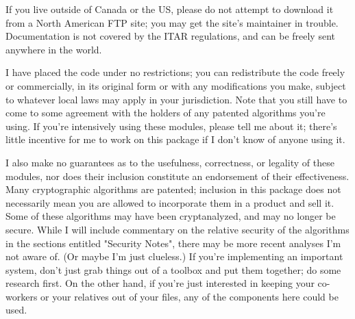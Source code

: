 \documentclass{howto}
\begin{document}


If you live outside of Canada or the US, please do not attempt to
download it from a North American FTP site; you may get the site's
maintainer in trouble.  Documentation is not covered by the ITAR
regulations, and can be freely sent anywhere in the world.

I have placed the code under no restrictions; you can redistribute the
code freely or commercially, in its original form or with any
modifications you make, subject to whatever local laws may apply in your
jurisdiction.  Note that you still have to come to some agreement with
the holders of any patented algorithms you're using.  If you're
intensively using these modules, please tell me about it; there's little
incentive for me to work on this package if I don't know of anyone using
it.

I also make no guarantees as to the usefulness, correctness, or legality
of these modules, nor does their inclusion constitute an endorsement of
their effectiveness.  Many cryptographic algorithms are patented;
inclusion in this package does not necessarily mean you are allowed to
incorporate them in a product and sell it.  Some of these algorithms may
have been cryptanalyzed, and may no longer be secure.  While I will
include commentary on the relative security of the algorithms in the
sections entitled "Security Notes", there may be more recent analyses
I'm not aware of.  (Or maybe I'm just clueless.)  If you're implementing
an important system, don't just grab things out of a toolbox and put
them together; do some research first.  On the other hand, if you're
just interested in keeping your co-workers or your relatives out of your
files, any of the components here could be used.
\end{document}
